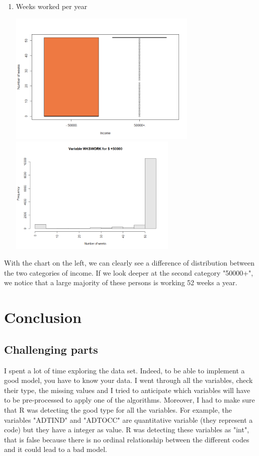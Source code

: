 \documentclass{article}
\begin{document}
\begin{enumerate}
    \item Weeks worked per year \\
\begin{center}
\includegraphics[width=9cm]{WKSWORKz.png}
\includegraphics[width=8cm]{WKSWORKz2.png}
\end{center}
\end{enumerate} 
With the chart on the left, we can clearly see a difference of distribution between the two categories of income. If we look deeper at the second category "50000+", we notice that a large majority of these persons is working 52 weeks a year.

\newpage
\section{Conclusion}
\subsection{Challenging parts}
\noindent I spent a lot of time exploring the data set. Indeed, to be able to implement a good model, you have to know your data. I went through all the variables, check their type, the missing values and I tried to anticipate which variables will have to be pre-processed to apply one of the algorithms. Moreover, I had to make sure that R was detecting the good type for all the variables. For example, the variables "ADTIND" and "ADTOCC" are quantitative variable (they represent a code) but they have a integer as value. R was detecting these variables as "int", that is false because there is no ordinal relationship between the different codes and it could lead to a bad model.\\
\end{document}
